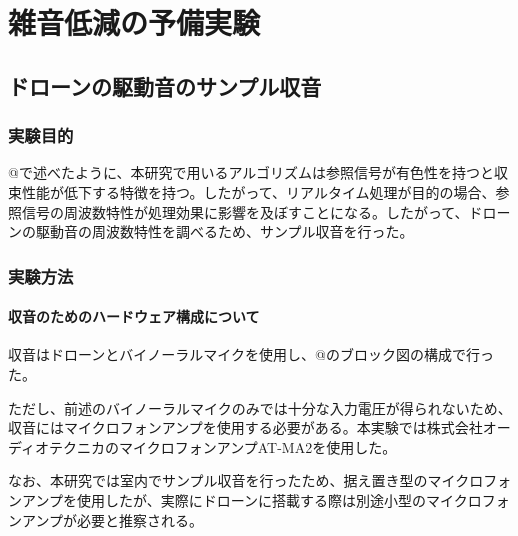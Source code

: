\hypertarget{ux96d1ux97f3ux4f4eux6e1bux306eux4e88ux5099ux5b9fux9a13}{%
\section{雑音低減の予備実験}\label{ux96d1ux97f3ux4f4eux6e1bux306eux4e88ux5099ux5b9fux9a13}}

\hypertarget{ux30c9ux30edux30fcux30f3ux306eux99c6ux52d5ux97f3ux306eux30b5ux30f3ux30d7ux30ebux53ceux97f3}{%
\subsection{ドローンの駆動音のサンプル収音}\label{ux30c9ux30edux30fcux30f3ux306eux99c6ux52d5ux97f3ux306eux30b5ux30f3ux30d7ux30ebux53ceux97f3}}

\hypertarget{ux5b9fux9a13ux76eeux7684}{%
\subsubsection{実験目的}\label{ux5b9fux9a13ux76eeux7684}}

@で述べたように、本研究で用いるアルゴリズムは参照信号が有色性を持つと収束性能が低下する特徴を持つ。したがって、リアルタイム処理が目的の場合、参照信号の周波数特性が処理効果に影響を及ぼすことになる。したがって、ドローンの駆動音の周波数特性を調べるため、サンプル収音を行った。

\hypertarget{ux5b9fux9a13ux65b9ux6cd5}{%
\subsubsection{実験方法}\label{ux5b9fux9a13ux65b9ux6cd5}}

\hypertarget{ux53ceux97f3ux306eux305fux3081ux306eux30cfux30fcux30c9ux30a6ux30a7ux30a2ux69cbux6210ux306bux3064ux3044ux3066}{%
\paragraph{収音のためのハードウェア構成について}\label{ux53ceux97f3ux306eux305fux3081ux306eux30cfux30fcux30c9ux30a6ux30a7ux30a2ux69cbux6210ux306bux3064ux3044ux3066}}

収音はドローンとバイノーラルマイクを使用し、@のブロック図の構成で行った。

ただし、前述のバイノーラルマイクのみでは十分な入力電圧が得られないため、収音にはマイクロフォンアンプを使用する必要がある。本実験では株式会社オーディオテクニカのマイクロフォンアンプAT-MA2を使用した。

なお、本研究では室内でサンプル収音を行ったため、据え置き型のマイクロフォンアンプを使用したが、実際にドローンに搭載する際は別途小型のマイクロフォンアンプが必要と推察される。

